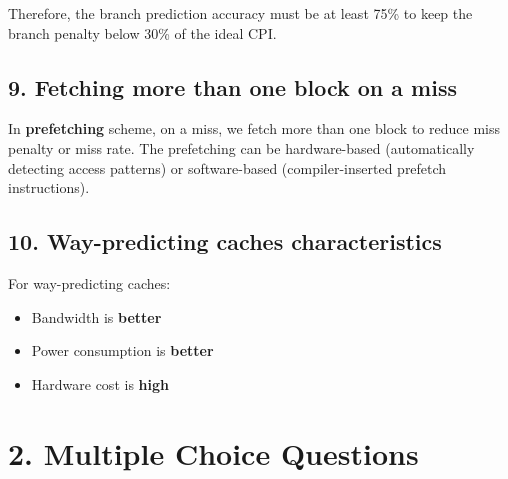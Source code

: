 \documentclass[12pt]{article}
\begin{document}
Therefore, the branch prediction accuracy must be at least 75\% to keep the branch penalty below 30\% of the ideal CPI.

\subsection*{9. Fetching more than one block on a miss}
In \textbf{prefetching} scheme, on a miss, we fetch more than one block to reduce miss penalty or miss rate. The prefetching can be hardware-based (automatically detecting access patterns) or software-based (compiler-inserted prefetch instructions).

\subsection*{10. Way-predicting caches characteristics}
For way-predicting caches:
\begin{itemize}
    \item Bandwidth is \textbf{better}
    \item Power consumption is \textbf{better}
    \item Hardware cost is \textbf{high}
\end{itemize}

\section*{2. Multiple Choice Questions}
\end{document}
